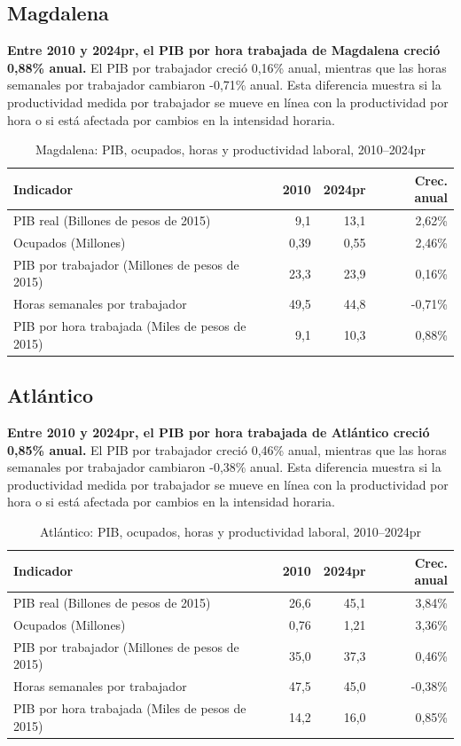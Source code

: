 \subsection{Magdalena}
\textbf{Entre 2010 y 2024pr, el PIB por hora trabajada de Magdalena creció 0,88\% anual.} El PIB por trabajador creció 0,16\% anual, mientras que las horas semanales por trabajador cambiaron -0,71\% anual. Esta diferencia muestra si la productividad medida por trabajador se mueve en línea con la productividad por hora o si está afectada por cambios en la intensidad horaria.
\begin{table}[H]
\centering
\caption{Magdalena: PIB, ocupados, horas y productividad laboral, 2010--2024pr}
\label{tab:departamento_magdalena_productividad}
\scriptsize
\begin{tabular}{lrrr}
\toprule
Indicador & 2010 & 2024pr & Crec. anual \\
\midrule
PIB real (Billones de pesos de 2015) & 9,1 & 13,1 & 2,62\% \\
Ocupados (Millones) & 0,39 & 0,55 & 2,46\% \\
PIB por trabajador (Millones de pesos de 2015) & 23,3 & 23,9 & 0,16\% \\
Horas semanales por trabajador & 49,5 & 44,8 & -0,71\% \\
PIB por hora trabajada (Miles de pesos de 2015) & 9,1 & 10,3 & 0,88\% \\
\bottomrule
\end{tabular}
\end{table}

\subsection{Atlántico}
\textbf{Entre 2010 y 2024pr, el PIB por hora trabajada de Atlántico creció 0,85\% anual.} El PIB por trabajador creció 0,46\% anual, mientras que las horas semanales por trabajador cambiaron -0,38\% anual. Esta diferencia muestra si la productividad medida por trabajador se mueve en línea con la productividad por hora o si está afectada por cambios en la intensidad horaria.
\begin{table}[H]
\centering
\caption{Atlántico: PIB, ocupados, horas y productividad laboral, 2010--2024pr}
\label{tab:departamento_atlantico_productividad}
\scriptsize
\begin{tabular}{lrrr}
\toprule
Indicador & 2010 & 2024pr & Crec. anual \\
\midrule
PIB real (Billones de pesos de 2015) & 26,6 & 45,1 & 3,84\% \\
Ocupados (Millones) & 0,76 & 1,21 & 3,36\% \\
PIB por trabajador (Millones de pesos de 2015) & 35,0 & 37,3 & 0,46\% \\
Horas semanales por trabajador & 47,5 & 45,0 & -0,38\% \\
PIB por hora trabajada (Miles de pesos de 2015) & 14,2 & 16,0 & 0,85\% \\
\bottomrule
\end{tabular}
\end{table}

